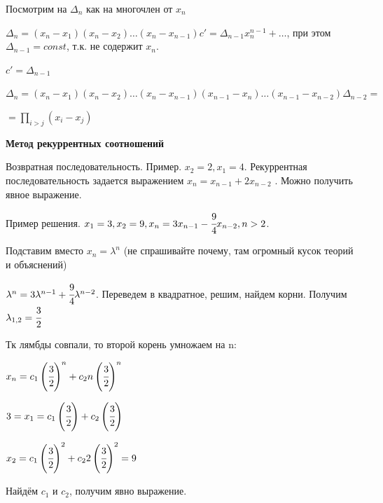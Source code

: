 Посмотрим на $\Delta_n$ как на многочлен от $x_n$

\(\Delta_n = (x_n - x_1)(x_n - x_2)\ldots(x_n - x_{n - 1}) c' = \Delta_{n - 1} x_n^{n - 1} + \ldots\), при этом $\Delta_{n-1}=const$, т.к. не содержит $x_n$.

\(c' = \Delta_{n - 1}\)

\(\Delta_n = (x_n - x_1)(x_n - x_2)\ldots(x_n - x_{n - 1})(x_{n - 1} - x_n)\ldots(x_{n - 1} - x_{n - 2}) \Delta_{n - 2} =\)

\(= \prod\limits_{i > j}(x_i - x_j)\)

\textbf{Метод рекуррентных соотношений}

Возвратная последовательность. Пример.  \(x_2 = 2, x_1 = 4\). Рекуррентная последовательность задается выражением \(x_n = x_{n - 1} + 2 x_{n - 2}\) . Можно получить явное выражение.

Пример решения. \(x_1 = 3, x_2 = 9, x_n = 3 x_{n-1} - \cfrac{9}{4} x_{n-2}, n >2\).

Подставим вместо \(x_n = \lambda^n \) (не спрашивайте почему, там огромный кусок теорий и объяснений)

\( \lambda^n  = 3\lambda^{n-1} +  \cfrac{9}{4}\lambda^{n-2}\). Переведем в квадратное, решим, найдем корни. Получим \(\lambda_{1,2} = \cfrac{3}{2}\)

Тк лямбды совпали, то второй корень умножаем на n:

\(x_n  = c_1 \left(\cfrac{3}{2}\right)^n  + c_2 n \left(\cfrac{3}{2}\right)^n \)

\(3 = x_1 = c_1 \left(\cfrac{3}{2}\right) + c_2 \left(\cfrac{3}{2}\right)\)

\(x_2 = c_1 \left(\cfrac{3}{2}\right)^2 + c_2 2 \left(\cfrac{3}{2}\right)^2 = 9\)

Найдём \(c_1\) и \(c_2\), получим явно выражение.

